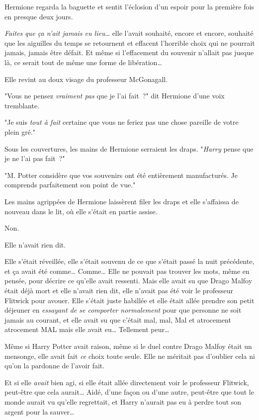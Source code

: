Hermione regarda la baguette et sentit l'éclosion d'un espoir pour la première fois en presque deux jours.

\emph{Faites que ça n'ait jamais eu lieu…} elle l'avait souhaité, encore et encore, souhaité que les aiguilles du temps se retournent et effacent l'horrible choix qui ne pourrait jamais, jamais être défait. Et même si l'effacement du souvenir n'allait pas jusque là, ce serait tout de même une forme de libération…

Elle revint au doux visage du professeur McGonagall.

"Vous ne pensez \emph{vraiment pas} que je l'ai fait~?" dit Hermione d'une voix tremblante.

"Je suis \emph{tout à fait} certaine que vous ne feriez pas une chose pareille de votre plein gré."

Sous les couvertures, les mains de Hermione serraient les draps. "\emph{Harry} pense que je ne l'ai pas fait~?"

"M. Potter considère que vos souvenirs ont été entièrement manufacturés. Je comprends parfaitement son point de vue."

Les mains agrippées de Hermione laissèrent filer les draps et elle s'affaissa de nouveau dans le lit, où elle s'était en partie assise.

Non.

Elle n'avait rien dit.

Elle s'était réveillée, elle s'était souvenu de ce que s'était passé la nuit précédente, et ça avait été comme… Comme… Elle ne pouvait pas trouver les mots, même en pensée, pour décrire ce qu'elle avait ressenti. Mais elle avait su que Drago Malfoy était déjà mort et elle n'avait rien dit, elle n'avait pas été voir le professeur Flitwick pour avouer. Elle s'était juste habillée et elle était allée prendre son petit déjeuner en \emph{essayant de se comporter normalement} pour que personne ne soit jamais au courant, et elle avait su que c'était mal, mal, Mal et atrocement atrocement MAL mais elle avait eu… Tellement peur…

Même si Harry Potter avait raison, même si le duel contre Drago Malfoy était un mensonge, elle avait fait \emph{ce} choix toute seule. Elle ne méritait pas d'oublier cela ni qu'on la pardonne de l'avoir fait.

Et si elle \emph{avait} bien agi, si elle était allée directement voir le professeur Flitwick, peut-être que cela aurait… Aidé, d'une façon ou d'une autre, peut-être que tout le monde aurait vu qu'elle regrettait, et Harry n'aurait pas eu à perdre tout son argent pour la sauver…


